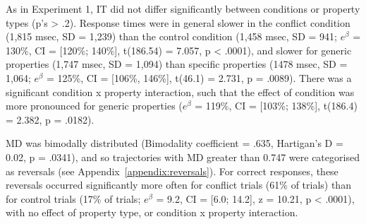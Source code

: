 
As in Experiment 1, IT did not differ significantly
between conditions or property types (p's > .2).
Response times were in general slower in the conflict condition (1,815 msec, SD = 1,239)
than the control condition (1,458 msec, SD = 941;
$e^{\beta}$ = 130\%, CI = [120\%; 140\%],
t(186.54) = 7.057, p < .0001),
and slower for generic properties (1,747 msec, SD = 1,094)
than specific properties (1478 msec, SD = 1,064;
$e^{\beta}$ = 125\%, CI = [106\%, 146\%],
t(46.1) = 2.731, p = .0089).
There was a significant condition x property interaction,
such that the effect of condition
was more pronounced for generic properties
($e^{\beta}$ = 119\%, CI = [103\%; 138\%],
t(186.4) = 2.382, p = .0182).

MD was bimodally distributed
(Bimodality coefficient = .635,
Hartigan's D = 0.02, p = .0341),
and so trajectories with MD greater than 0.747 were categorised as reversals
(see Appendix~\ref{appendix:reversals}).
For correct responses, these reversals occurred
significantly more often for conflict trials (61\% of trials)
than for control trials (17\% of trials;
$e^{\beta}$ = 9.2, CI = [6.0; 14.2], z = 10.21, p < .0001),
with no effect of property type, or condition x property interaction.

